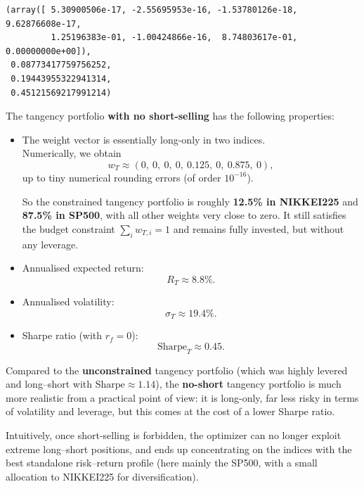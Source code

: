 \documentclass[11pt]{article}
\begin{document}
            \begin{tcolorbox}[breakable, size=fbox, boxrule=.5pt, pad at break*=1mm, opacityfill=0]
\begin{Verbatim}[commandchars=\\\{\}]
(array([ 5.30900506e-17, -2.55695953e-16, -1.53780126e-18,  9.62876608e-17,
         1.25196383e-01, -1.00424866e-16,  8.74803617e-01,  0.00000000e+00]),
 0.08773417759756252,
 0.19443955322941314,
 0.45121569217991214)
\end{Verbatim}
\end{tcolorbox}
        
    The tangency portfolio \textbf{with no short-selling} has the following
properties:

\begin{itemize}
\item
  The weight vector is essentially long-only in two indices.\\
  Numerically, we obtain\\
  \[
  w_T \approx 
  (0,\ 0,\ 0,\ 0,\ 0.125,\ 0,\ 0.875,\ 0),
  \] up to tiny numerical rounding errors (of order \(10^{-16}\)).

  So the constrained tangency portfolio is roughly \textbf{12.5\% in
  NIKKEI225} and \textbf{87.5\% in SP500}, with all other weights very
  close to zero. It still satisfies the budget constraint
  \(\sum_i w_{T,i} = 1\) and remains fully invested, but without any
  leverage.
\item
  Annualised expected return:\\
  \[
  R_T \approx 8.8\%.
  \]
\item
  Annualised volatility:\\
  \[
  \sigma_T \approx 19.4\%.
  \]
\item
  Sharpe ratio (with \(r_f = 0\)):\\
  \[
  \text{Sharpe}_T \approx 0.45.
  \]
\end{itemize}

Compared to the \textbf{unconstrained} tangency portfolio (which was
highly levered and long--short with \(\text{Sharpe} \approx 1.14\)), the
\textbf{no-short} tangency portfolio is much more realistic from a
practical point of view: it is long-only, far less risky in terms of
volatility and leverage, but this comes at the cost of a lower Sharpe
ratio.

Intuitively, once short-selling is forbidden, the optimizer can no
longer exploit extreme long--short positions, and ends up concentrating
on the indices with the best standalone risk--return profile (here
mainly the SP500, with a small allocation to NIKKEI225 for
diversification).
\end{document}
